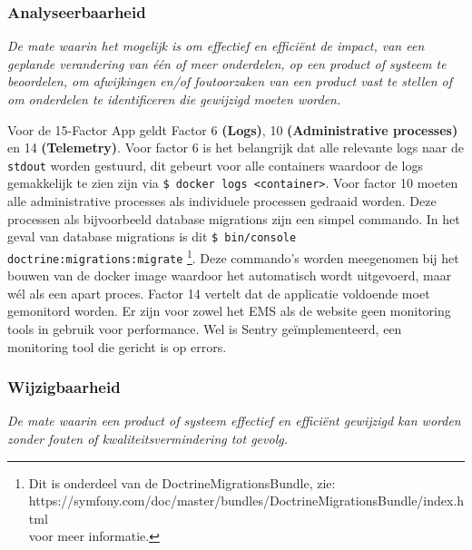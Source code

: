 \subsubsection{Analyseerbaarheid}
\textit{De mate waarin het mogelijk is om effectief en efficiënt de impact, van een geplande verandering van één of meer onderdelen, op een product of systeem te beoordelen, om afwijkingen en/of foutoorzaken van een product vast te stellen of om onderdelen te identificeren die gewijzigd moeten worden.}

Voor de 15-Factor App geldt Factor 6 \textbf{(Logs)}, 10 \textbf{(Administrative processes)} en 14 \textbf{(Telemetry)}. Voor factor 6 is het belangrijk dat alle relevante logs naar de \texttt{stdout} worden gestuurd, dit gebeurt voor alle containers waardoor de logs gemakkelijk te zien zijn via \texttt{\$ docker logs <container>}. Voor factor 10 moeten alle administrative processes als individuele processen gedraaid worden. Deze processen als bijvoorbeeld database migrations zijn een simpel commando. In het geval van database migrations is dit \texttt{\$ bin/console doctrine:migrations:migrate} \footnote{Dit is onderdeel van de DoctrineMigrationsBundle, zie:\\ https://symfony.com/doc/master/bundles/DoctrineMigrationsBundle/index.html\\voor meer informatie.}. Deze commando's worden meegenomen bij het bouwen van de docker image waardoor het automatisch wordt uitgevoerd, maar wél als een apart proces. Factor 14 vertelt dat de applicatie voldoende moet gemonitord worden. Er zijn voor zowel het EMS als de website geen monitoring tools in gebruik voor performance. Wel is Sentry geïmplementeerd, een monitoring tool die gericht is op errors.

\subsubsection{Wijzigbaarheid}
\textit{De mate waarin een product of systeem effectief en efficiënt gewijzigd kan worden zonder fouten of kwaliteitsvermindering tot gevolg.}

